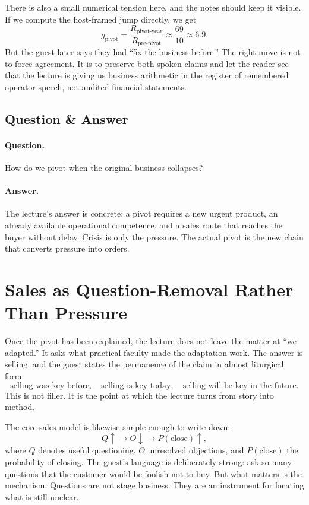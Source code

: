 There is also a small numerical tension here, and the notes should keep it visible. If we compute the host-framed jump directly, we get
\begin{equation}
g_{\text{pivot}}
=
\frac{R_{\text{pivot-year}}}{R_{\text{pre-pivot}}}
\approx
\frac{69}{10}
\approx 6.9.
\end{equation}
But the guest later says they had ``5x the business before.'' The right move is not to force agreement. It is to preserve both spoken claims and let the reader see that the lecture is giving us business arithmetic in the register of remembered operator speech, not audited financial statements.

\subsection{Question \& Answer}

\paragraph{Question.} How do we pivot when the original business collapses?

\paragraph{Answer.} The lecture's answer is concrete: a pivot requires a new urgent product, an already available operational competence, and a sales route that reaches the buyer without delay. Crisis is only the pressure. The actual pivot is the new chain that converts pressure into orders.

\section{Sales as Question-Removal Rather Than Pressure}

Once the pivot has been explained, the lecture does not leave the matter at ``we adapted.'' It asks what practical faculty made the adaptation work. The answer is selling, and the guest states the permanence of the claim in almost liturgical form:
\begin{equation}
\text{selling was key before},
\quad
\text{selling is key today},
\quad
\text{selling will be key in the future}.
\end{equation}
This is not filler. It is the point at which the lecture turns from story into method.

The core sales model is likewise simple enough to write down:
\begin{equation}
Q\uparrow \to O\downarrow \to P(\text{close})\uparrow,
\end{equation}
where \(Q\) denotes useful questioning, \(O\) unresolved objections, and \(P(\text{close})\) the probability of closing. The guest's language is deliberately strong: ask so many questions that the customer would be foolish not to buy. But what matters is the mechanism. Questions are not stage business. They are an instrument for locating what is still unclear.

